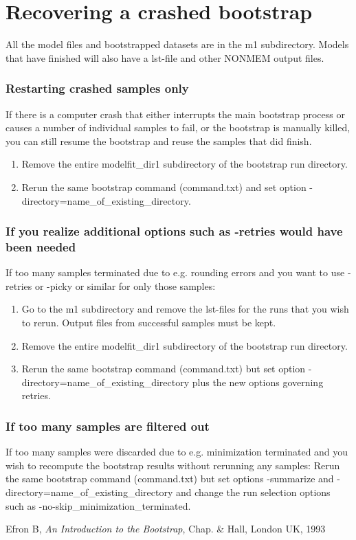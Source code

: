 \section{Recovering a crashed bootstrap}

All the model files and bootstrapped datasets are in the m1 subdirectory. Models that have finished will also have a 
lst-file and other NONMEM output files.  
\subsubsection*{Restarting crashed samples only}
If there is a computer crash that either interrupts the main bootstrap process or causes a number of individual samples to fail, or the bootstrap is manually killed, you can still resume the bootstrap and reuse the samples that did finish.
\begin{enumerate}
    \item Remove the entire modelfit\_dir1 subdirectory of the bootstrap run directory.
	\item Rerun the same bootstrap command (command.txt) and set option -directory=name\_of\_existing\_directory. 
\end{enumerate}

\subsubsection*{If you realize additional options such as -retries would have been needed}
If too many samples terminated due to e.g. rounding errors and you want to use -retries or -picky or similar for only those samples:
\begin{enumerate}
	\item Go to the m1 subdirectory and remove the lst-files for the runs that you wish to rerun. Output files from successful samples must be kept.
    \item Remove the entire modelfit\_dir1 subdirectory of the bootstrap run directory.
	\item Rerun the same bootstrap command 
(command.txt) but set option -directory=name\_of\_existing\_directory 
plus the new options governing retries.
\end{enumerate}

\subsubsection*{If too many samples are filtered out}
If too many samples were discarded due to e.g. minimization terminated and you wish to recompute the bootstrap results without rerunning any samples: 
Rerun the same bootstrap command (command.txt) but set options -summarize
and -directory=name\_of\_existing\_directory and change the
run selection options such as -no-skip\_minimization\_terminated. 

\begin{thebibliography}{1}
 Efron B, {\em An Introduction to the Bootstrap}, Chap. \& Hall, London UK, 1993
\end{thebibliography}


